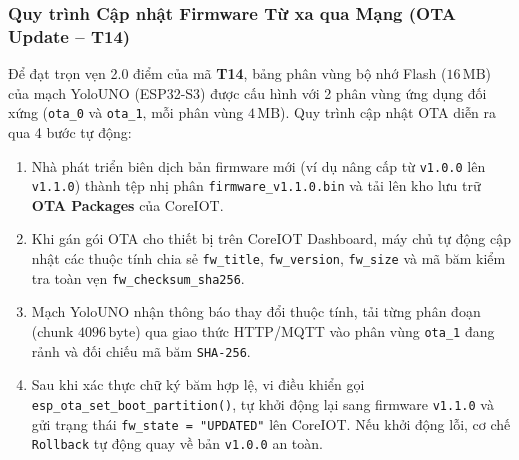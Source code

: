 \documentclass{hcmut-report}
\begin{document}
\subsubsection[Cập nhật Firmware Từ xa qua Mạng (OTA -- T14)]{Quy trình Cập nhật Firmware Từ xa qua Mạng (OTA Update -- T14)}
Để đạt trọn vẹn 2.0 điểm của mã \textbf{T14}, bảng phân vùng bộ nhớ Flash ($16\,\text{MB}$) của mạch YoloUNO (ESP32-S3) được cấu hình với 2 phân vùng ứng dụng đối xứng (\texttt{ota\_0} và \texttt{ota\_1}, mỗi phân vùng $4\,\text{MB}$). Quy trình cập nhật OTA diễn ra qua 4 bước tự động:
\begin{enumerate}
  \item Nhà phát triển biên dịch bản firmware mới (ví dụ nâng cấp từ \texttt{v1.0.0} lên \texttt{v1.1.0}) thành tệp nhị phân \texttt{firmware\_v1.1.0.bin} và tải lên kho lưu trữ \textbf{OTA Packages} của CoreIOT.
  \item Khi gán gói OTA cho thiết bị trên CoreIOT Dashboard, máy chủ tự động cập nhật các thuộc tính chia sẻ \texttt{fw\_title}, \texttt{fw\_version}, \texttt{fw\_size} và mã băm kiểm tra toàn vẹn \texttt{fw\_checksum\_sha256}.
  \item Mạch YoloUNO nhận thông báo thay đổi thuộc tính, tải từng phân đoạn (chunk $4096\,\text{byte}$) qua giao thức HTTP/MQTT vào phân vùng \texttt{ota\_1} đang rảnh và đối chiếu mã băm \texttt{SHA-256}.
  \item Sau khi xác thực chữ ký băm hợp lệ, vi điều khiển gọi \texttt{esp\_ota\_set\_boot\_partition()}, tự khởi động lại sang firmware \texttt{v1.1.0} và gửi trạng thái \texttt{fw\_state = "UPDATED"} lên CoreIOT. Nếu khởi động lỗi, cơ chế \texttt{Rollback} tự động quay về bản \texttt{v1.0.0} an toàn.
\end{enumerate}
\end{document}
